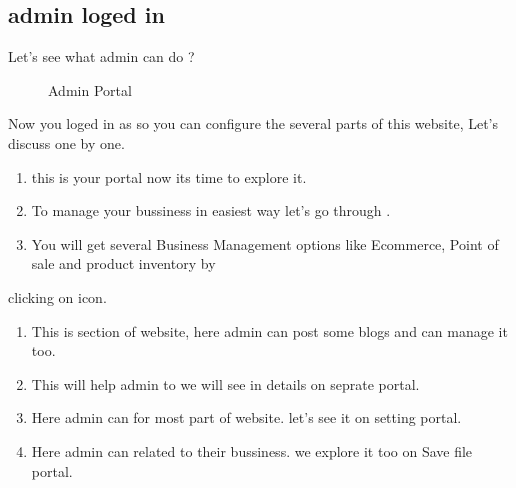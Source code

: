 \documentclass[a4paper,10pt,english]{report}
\begin{document}
\subsection{admin loged in}
\label{\detokenize{adminlogedin:admin-loged-in}}\label{\detokenize{adminlogedin::doc}}
Let’s see what admin can do ?

\begin{figure}[htbp]
\centering
\capstart

\noindent{}
\caption{Admin Portal}\label{\detokenize{adminlogedin:id3}}\label{\detokenize{adminlogedin:id1}}\end{figure}

Now you loged in as  so you can configure the several parts of this website, Let’s discuss one by one.
\begin{enumerate}
\def\theenumi{\arabic{enumi}}
\def\labelenumi{\theenumi .}
\makeatletter\def\p@enumii{\p@enumi \theenumi .}\makeatother
\item {} 
this is your  portal now its time to explore it.

\item {} 
To manage your bussiness in easiest way let’s go through .

\item {} 
You will get several Business Management options like Ecommerce, Point of sale and product inventory by

\end{enumerate}

clicking on  icon.
\begin{enumerate}
\def\theenumi{\arabic{enumi}}
\def\labelenumi{\theenumi .}
\makeatletter\def\p@enumii{\p@enumi \theenumi .}\makeatother
\setcounter{enumi}{3}
\item {} 
This is  section of website, here admin can post some blogs and can manage it too.

\item {} 
This will help admin to  we will see in details on seprate portal.

\item {} 
Here admin can  for most part of website. let’s see it on setting portal.

\item {} 
Here admin can  related to their bussiness. we explore it too on Save file portal.

\end{enumerate}
\end{document}
